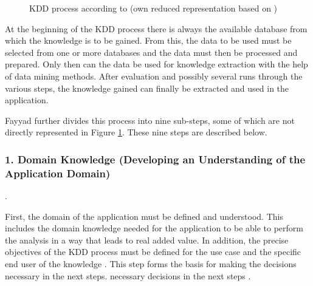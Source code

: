 \begin{figure}[H]
\begin{center}
        \caption{KDD process according to \cite{Fayyad:1996} (own reduced representation based on \cite{Fayyad:1996})} 
        \label{KDDFayyad}
    \end{center}
\end{figure}






At the beginning of the KDD process there is always the available database from which the knowledge is to be gained. From this, the data to be used must be selected from one or more databases and the data must then be processed and prepared. Only then can the data be used for knowledge extraction with the help of data mining methods. After evaluation and possibly several runs through the various steps, the knowledge gained can finally be extracted and used in the application.

Fayyad further divides this process into nine sub-steps, some of which are not directly represented in Figure \ref{KDDFayyad}. These nine steps are described below.

\subsubsection{1. Domain Knowledge (Developing an Understanding of the Application Domain)}.

First, the domain of the application must be defined and understood. This includes the domain knowledge needed for the application to be able to perform the analysis in a way that leads to real added value. In addition, the precise objectives of the KDD process must be defined for the use case and the specific end user of the knowledge \cite{Fayyad:1996,Kurgan:2006}. This step forms the basis for making the decisions necessary in the next steps. 
necessary decisions in the next steps \cite{Maimon:2010}.

